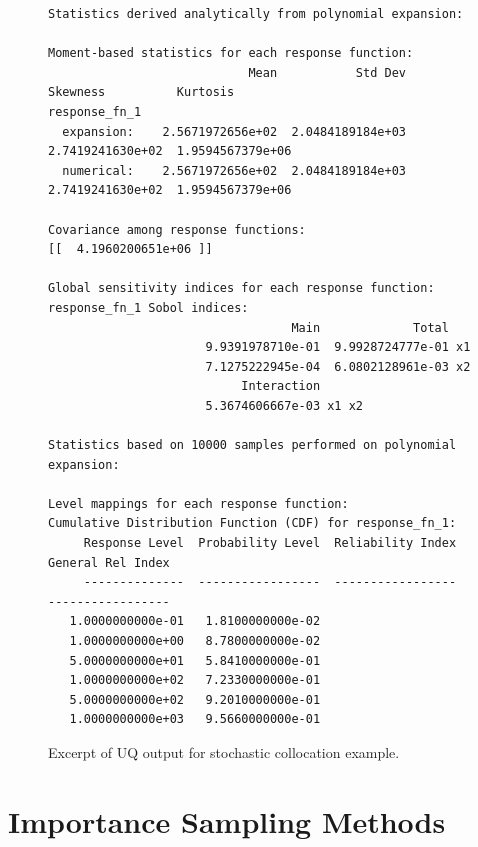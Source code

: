 \begin{figure}
\centering
\begin{bigbox}
\begin{footnotesize}
\begin{verbatim}
Statistics derived analytically from polynomial expansion:

Moment-based statistics for each response function:
                            Mean           Std Dev          Skewness          Kurtosis
response_fn_1
  expansion:    2.5671972656e+02  2.0484189184e+03  2.7419241630e+02  1.9594567379e+06
  numerical:    2.5671972656e+02  2.0484189184e+03  2.7419241630e+02  1.9594567379e+06

Covariance among response functions:
[[  4.1960200651e+06 ]] 

Global sensitivity indices for each response function:
response_fn_1 Sobol indices:
                                  Main             Total
                      9.9391978710e-01  9.9928724777e-01 x1
                      7.1275222945e-04  6.0802128961e-03 x2
                           Interaction
                      5.3674606667e-03 x1 x2 

Statistics based on 10000 samples performed on polynomial expansion:

Level mappings for each response function:
Cumulative Distribution Function (CDF) for response_fn_1:
     Response Level  Probability Level  Reliability Index  General Rel Index
     --------------  -----------------  -----------------  -----------------
   1.0000000000e-01   1.8100000000e-02
   1.0000000000e+00   8.7800000000e-02
   5.0000000000e+01   5.8410000000e-01
   1.0000000000e+02   7.2330000000e-01
   5.0000000000e+02   9.2010000000e-01
   1.0000000000e+03   9.5660000000e-01
\end{verbatim}
\end{footnotesize}
\end{bigbox}
\caption{Excerpt of UQ output for stochastic collocation example.}
\label{uq:figure12}
\end{figure}

\section{Importance Sampling Methods}\label{uq:importance}


